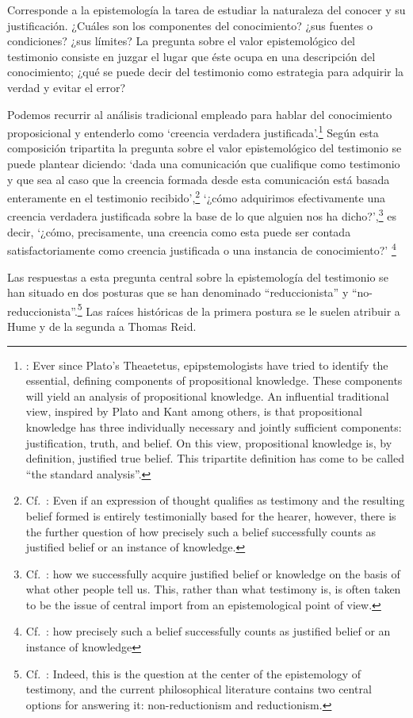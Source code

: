 Corresponde a la epistemología la tarea de estudiar la naturaleza del conocer y su justificación. ¿Cuáles son los componentes del conocimiento? ¿sus fuentes o condiciones? ¿sus límites? La pregunta sobre el valor epistemológico del testimonio consiste en juzgar el lugar que éste ocupa en una descripción del conocimiento; ¿qué se puede decir del testimonio como estrategia para adquirir la verdad y evitar el error?

Podemos recurrir al análisis tradicional empleado para hablar del conocimiento proposicional y entenderlo como \enquote*{creencia verdadera justificada}.\footnote{\cite[4]{moser2002ep}: Ever since Plato's Theaetetus, epipstemologists have tried to identify the essential, defining components of propositional knowledge. These components will yield an analysis of propositional knowledge. An influential traditional view, inspired by Plato and Kant among others, is that propositional knowledge has three individually necessary and jointly sufficient components: justification, truth, and belief. On this view, propositional knowledge is, by definition, justified true belief. This tripartite definition has come to be called ``the standard analysis''.} Según esta composición tripartita la pregunta sobre el valor epistemológico del testimonio se puede plantear diciendo: \enquote*{dada una comunicación que cualifique como testimonio y que sea al caso que la creencia formada desde esta comunicación está basada enteramente en el testimonio recibido},\footnote{Cf.~\cite[4]{lackeysosa2006eptest}: Even if an expression of thought qualifies as testimony and the resulting belief formed is entirely testimonially based for the hearer, however, there is the further question of how precisely such a belief successfully counts as justified belief or an instance of knowledge.} \enquote*{¿cómo adquirimos efectivamente una creencia verdadera justificada sobre la base de lo que alguien nos ha dicho?},\footnote{Cf.~\cite[2]{lackeysosa2006eptest}: how we successfully acquire justified belief or knowledge on the basis of what other people tell us. This, rather than what testimony is, is often taken to be the issue of central import from an epistemological point of view.} es decir, \enquote*{¿cómo, precisamente, una creencia como esta puede ser contada satisfactoriamente como creencia justificada o una instancia de conocimiento?} \footnote{Cf.~\cite[4]{lackeysosa2006eptest}: how precisely such a belief successfully counts as justified belief or an instance of knowledge}

Las respuestas a esta pregunta central sobre la epistemología del testimonio se han situado en dos posturas que se han denominado \enquote{reduccionista} y \enquote{no-reduccionista}.\footnote{Cf.~\cite[4]{lackeysosa2006eptest}: Indeed, this is the question at the center of the epistemology of testimony, and the current philosophical literature contains two central options for answering it: non-reductionism and reductionism.} Las raíces históricas de la primera postura se le suelen atribuir a Hume y de la segunda a Thomas Reid.


